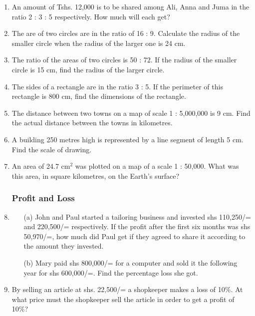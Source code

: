\begin{enumerate}
	\item An amount of Tshs. 12,000 is to be shared among Ali, Anna and Juma in the ratio 2 : 3 : 5 respectively. How much will each get?

	\item The are of two circles are in the ratio of 16 : 9. Calculate the radius of the smaller circle when the radius of the larger one is 24 cm.
	
	\item The ratio of the areas of two circles is 50 : 72. If the radius of the smaller circle is 15 cm, find the radius of the larger circle.
	
	\item The sides of a rectangle are in the ratio 3 : 5. If the perimeter of this rectangle is 800 cm, find the dimensions of the rectangle.
	
	\item The distance between two towns on a map of scale 1 : 5,000,000 is 9 cm. Find the actual distance between the towns in kilometres.
	
	\item A building 250 metres high is represented by a line segment of length 5 cm. Find the scale of drawing.
	
	\item An area of 24.7 cm$^2$ was plotted on a map of a scale 1 : 50,000. What was this area, in square kilometres, on the Earth's surface?
	
	
		\subsubsection{Profit and Loss}
	\item 
		\begin{itemize}
		\item[(a)] John and Paul started a tailoring business and invested shs 110,250/= and 220,500/= respectively. If the profit after the first six months was shs 50,970/=, how much did Paul get if they agreed to share it according to the amount they invested.
		\item[(b)] Mary paid shs 800,000/= for a computer and sold it the following year for shs 600,000/=. Find the percentage loss she got.
		\end{itemize}
		
	\item By selling an article at shs. 22,500/= a shopkeeper makes a loss of 10\%. At what price must the shopkeeper sell the article in order to get a profit of 10\%?
	

\end{enumerate}
